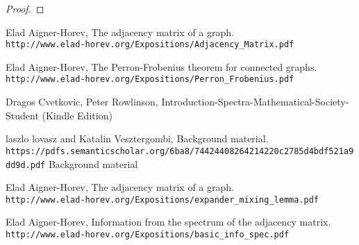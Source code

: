 \documentclass[a4paper, 11pt, oneside]{article}
\newenvironment{problem}[1]
  {\renewcommand\theinnercustomprob{#1}\innercustomprob}
  {\endinnercustomprob}
\begin{document}
 \begin{problem}{11}\label{problem11}
\end{problem}
\begin{proof}

\end{proof}		

\begin{thebibliography}{9} 
Elad Aigner-Horev,
The adjacency matrix of a graph.
\\\texttt{http://www.elad-horev.org/Expositions/Adjacency\_Matrix.pdf}

Elad Aigner-Horev,
The Perron-Frobenius theorem for connected graphs.
\\\texttt{http://www.elad-horev.org/Expositions/Perron\_Frobenius.pdf}

Dragos Cvetkovic, Peter Rowlinson,
Introduction-Spectra-Mathematical-Society-Student (Kindle Edition)

laszlo lovasz and Katalin Vesztergombi,
Background material.
\\\texttt{https://pdfs.semanticscholar.org/6ba8/74424408264214220c2785d4bdf521a9dd9d.pdf}
Background material

Elad Aigner-Horev,
The adjacency matrix of a graph.
\\\texttt{http://www.elad-horev.org/Expositions/expander\_mixing\_lemma.pdf}

Elad Aigner-Horev,
Information from the spectrum of the adjacency matrix.
\\\texttt{http://www.elad-horev.org/Expositions/basic\_info\_spec.pdf}
\end{thebibliography}
\end{document}
